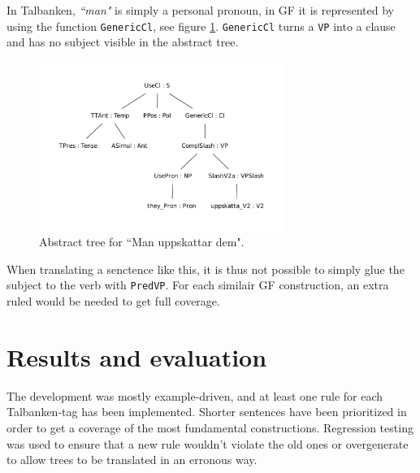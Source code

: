 \documentclass{report}
\begin{document}
In Talbanken, \emph{``man"} is simply a personal pronoun, 
in GF it is represented by using the function \verb|GenericCl|, see figure
\ref{fig:mappMan}. \verb|GenericCl| turns a \verb-VP- into a clause and has no
subject visible in the abstract tree. 
\begin{figure}[h]
\centering
\includegraphics[width=80mm]{man.pdf}
\caption{Abstract tree for ``Man uppskattar dem".}
\label{fig:mappMan}
\end{figure}
When translating a senctence like this, it is thus not possible to simply glue the
subject to the verb with \verb|PredVP|. For each similair GF construction, an extra ruled
would be needed to get full coverage. \\ %

%

\section{Results and evaluation}
The development was mostly example-driven, and at least one rule for each
Talbanken-tag has been implemented.
Shorter sentences have been prioritized in order to get a coverage of the most
fundamental constructions. 
Regression testing was used to ensure that a new rule wouldn't violate the old ones
or overgenerate to allow trees to be translated in an erronous way.
\end{document}

